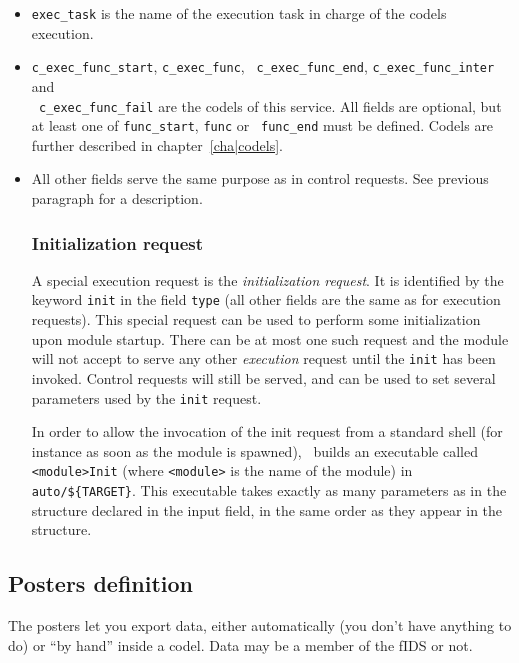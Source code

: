 \begin{itemize}
\item {\tt exec\_task} is the name of the execution task in charge of the
codels execution.

\item {\tt c\_exec\_func\_start}, {\tt c\_exec\_func}, {\tt
c\_exec\_func\_end},     {\tt    c\_exec\_func\_inter}    and \\     {\tt
c\_exec\_func\_fail} are  the  codels of  this  service.  All  fields are
optional,  but at least one  of  {\tt  func\_start},  {\tt func} or  {\tt
func\_end}  must  be   defined.    Codels   are  further described     in
chapter~\ref{cha|codels}.

\item All other fields serve the same purpose  as in control  requests.
See previous paragraph for a description.


\subsubsection{Initialization request}

A special execution request is   the {\em initialization request}. It  is
identified by the keyword {\tt  init} in the  field {\tt type} (all other
fields are the same as for execution requests).  This special request can
be used to perform some initialization upon module  startup. There can be
at  most one such request   and the module will   not accept to serve any
other   {\em    execution}  request until   the   {\tt   init}   has been
invoked.  Control requests will still  be served, and  can be used to set
several parameters used by the {\tt init} request.

In  order to allow the  invocation  of the init  request  from a standard
shell (for instance as soon as the  module is spawned), \GenoM\ builds an
executable called {\tt <module>Init} (where {\tt <module>} is the name of
the module) in {\tt  auto/\$\{TARGET\}}. This executable takes exactly as
many parameters as in the structure  declared in the  input field, in the
same order as they appear in the structure.

\end{itemize}

\subsection{Posters definition}

The  posters let you export   data, either automatically  (you don't have
anything to do) or ``by hand'' inside  a codel.  Data may  be a member of
the fIDS or not.


